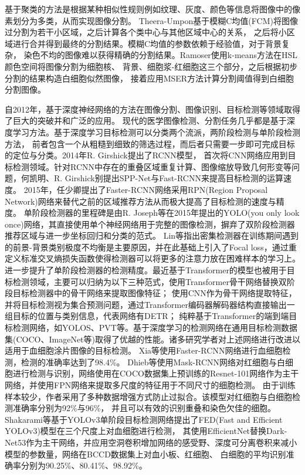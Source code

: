 基于聚类的方法是根据某种相似性规则例如纹理、灰度、颜色等信息将图像中的像素划分为多类，从而实现图像分割。
Theera-Umpon\cite{theera2005white}基于模糊C均值(FCM)将图像过分割为若干小区域，之后计算各个类中心与其他区域中心的关系，
之后将小区域进行合并得到最终的分割结果。模糊C均值的参数依赖于经验值，对于背景复杂，
染色不均的图像难以获得精确的分割结果。Ramoser\cite{ramoser2006leukocyte}使用k-means方法在HSL颜色空间将图像分割为细胞核、
背景、细胞浆-红细胞这三个部分，之后根据初步分割的结果构造白细胞似然图像，
接着应用MSER方法计算分割阈值得到白细胞分割图像。

自2012年，基于深度神经网络的方法在图像分割、图像识别、目标检测等领域取得了巨大的突破并和广泛的应用。
现代的医学图像检测、分割任务几乎都是基于深度学习方法。基于深度学习目标检测可以分类两个流派，两阶段检测与单阶段检测方法，
前者包含一个从粗糙到细致的筛选过程，而后者只需要一步即可完成目标的定位与分类。2014年R. Girshick\cite{girshick2014rich}提出了RCNN模型，
首次将CNN网络应用到目标检测领域。针对RCNN中存在的重叠区域重复计算、图像缩放导致几何形变等问题，何凯明\cite{he2015spatial}、R. Girshick\cite{girshick2015fast}别提出SPP-Net与Fast-RCNN来提高目标检测的运算速度。
2015年，任少卿\cite{ren2015faster}提出了Faster-RCNN网络采用RPN(Region Proposal Network)网络来替代之前的区域推荐方法从而极大提高了目标检测的速度与精度。
单阶段检测器的里程碑是由R. Joseph\cite{redmon2016you}等在2015年提出的YOLO(you only look once)网络，其直接使用单个神经网络用于完整的图像检测，摒弃了双阶段检测器推荐区域与进一步坐标回归和分类的范式。
Lin等\cite{lin2017focal}指出密集检测器在训练期间遇到的前景-背景类别极度不均衡是主要原因，并在此基础上引入了Focal loss，通过重定义标准交叉熵损失函数使得检测器可以将更多的注意力放在困难样本的学习上。
进一步提升了单阶段检测器的检测精度。最近基于Transformer的模型也被用于目标检测领域，主要可以归纳为以下三种范式，使用Transformer骨干网络替换双阶段目标检测器中的骨干网络来提取图像特征；
使用CNN作为骨干网络提取特征，并将目标检测视为集合预测问题，通过Transformer编码器解码器结构直接输出一组目标的位置与类别信息，代表网络有DETR\cite{zhu2020deformable}；
纯粹基于Transformer的端到端目标检测网络，如YOLOS、PVT等。基于深度学习的检测网络在通用目标检测数据集(COCO、ImageNet等)取得了优越的性能。诸多研究学者对上述网络进行改进以适用于血细胞涂片图像的目标检测。
Xia\cite{xia2019automated}等使用Faster-RCNN网络进行血细胞检测，检测的准确率达到了98.4\%。
Dhieb\cite{dhieb2019automated}等使用Mask-RCNN网络对红细胞与白细胞进行检测与识别，网络使用在COCO数据集上预训练的Resnet-101网络作为主干网络，并使用FPN网络来提取多尺度的特征用于不同尺寸的细胞检测。
由于训练样本较少，作者采用了多种数据增强方式防止过拟合。该模型对红细胞与白细胞检测准确率分别为92\%与96\%，
并且可以有效的识别重叠和染色欠佳的细胞。
Shakarami\cite{shakarami2021fast}等基于YOLOv3单阶段目标检测网络提出了FED(Fast and Efficient YOLOv3)模型在三个尺度上对血细胞进行检测，
其使用EfficientNet替换Dark-Net53作为主干网络，并应用空洞卷积增加网络的感受野、深度可分离卷积来减小模型的参数量，网络在BCCD数据集上对血小板、红细胞、
白细胞的平均识别准确率分别为90.25\%、80.41\%、98.92\%。

